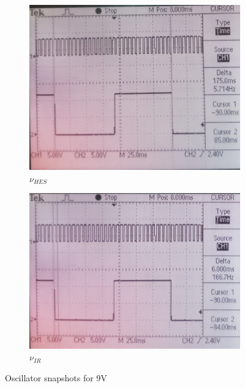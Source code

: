 \documentclass[12pt]{article}
\begin{document}
\begin{figure}[H]
	\begin{subfigure}[b]{0.5\linewidth}		
		\includegraphics[width = \linewidth, trim = {0 0 0 0}, clip]{HES9V.jpg}
		\caption{\( \nu_{HES} \)}
	\end{subfigure}
	\begin{subfigure}[b]{0.5\linewidth}						
		\includegraphics[width = \linewidth, trim = {0 0 0 0}, clip]{IR9V.jpg}
		\caption{\( \nu_{IR} \)}
	\end{subfigure}
	\caption{Oscillator snapshots for 9V}
\end{figure}
\end{document}
